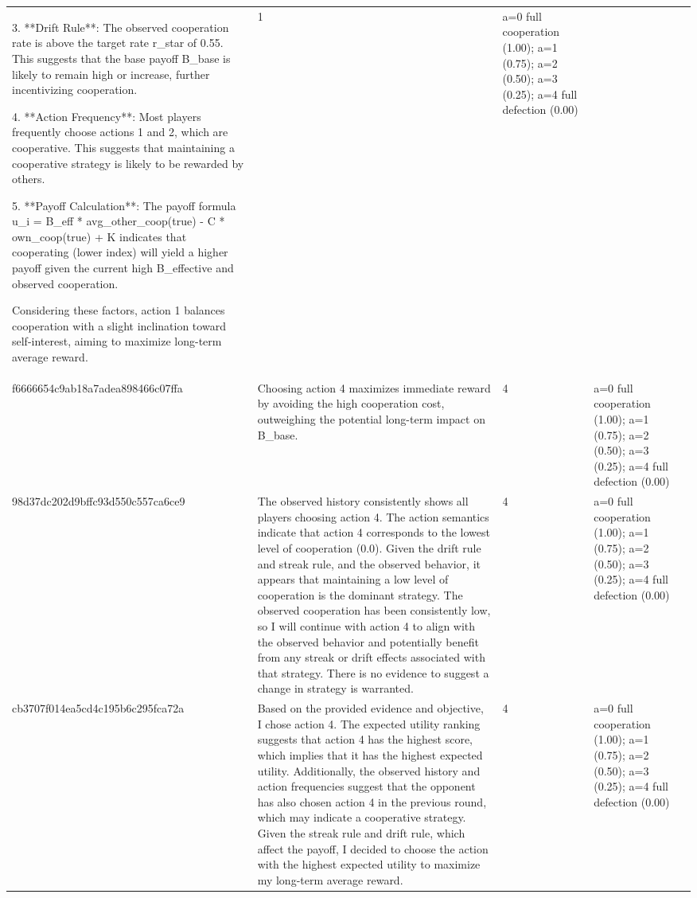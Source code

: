 \begin{tabular}{lp{8cm}ll l}
3. **Drift Rule**: The observed cooperation rate is above the target rate r\_star of 0.55. This suggests that the base payoff B\_base is likely to remain high or increase, further incentivizing cooperation.

4. **Action Frequency**: Most players frequently choose actions 1 and 2, which are cooperative. This suggests that maintaining a cooperative strategy is likely to be rewarded by others.

5. **Payoff Calculation**: The payoff formula u\_i = B\_eff * avg\_other\_coop(true) - C * own\_coop(true) + K indicates that cooperating (lower index) will yield a higher payoff given the current high B\_effective and observed cooperation.

Considering these factors, action 1 balances cooperation with a slight inclination toward self-interest, aiming to maximize long-term average reward. & 1 & a=0 full cooperation (1.00); a=1 (0.75); a=2 (0.50); a=3 (0.25); a=4 full defection (0.00) &  \\
f6666654c9ab18a7adea898466c07ffa & Choosing action 4 maximizes immediate reward by avoiding the high cooperation cost, outweighing the potential long-term impact on B\_base. & 4 & a=0 full cooperation (1.00); a=1 (0.75); a=2 (0.50); a=3 (0.25); a=4 full defection (0.00) &  \\
98d37dc202d9bffc93d550c557ca6ce9 & The observed history consistently shows all players choosing action 4. The action semantics indicate that action 4 corresponds to the lowest level of cooperation (0.0). Given the drift rule and streak rule, and the observed behavior, it appears that maintaining a low level of cooperation is the dominant strategy. The observed cooperation has been consistently low, so I will continue with action 4 to align with the observed behavior and potentially benefit from any streak or drift effects associated with that strategy. There is no evidence to suggest a change in strategy is warranted. & 4 & a=0 full cooperation (1.00); a=1 (0.75); a=2 (0.50); a=3 (0.25); a=4 full defection (0.00) &  \\
cb3707f014ea5cd4c195b6c295fca72a & Based on the provided evidence and objective, I chose action 4. The expected utility ranking suggests that action 4 has the highest score, which implies that it has the highest expected utility. Additionally, the observed history and action frequencies suggest that the opponent has also chosen action 4 in the previous round, which may indicate a cooperative strategy. Given the streak rule and drift rule, which affect the payoff, I decided to choose the action with the highest expected utility to maximize my long-term average reward. & 4 & a=0 full cooperation (1.00); a=1 (0.75); a=2 (0.50); a=3 (0.25); a=4 full defection (0.00) &  \\

\end{tabular}
